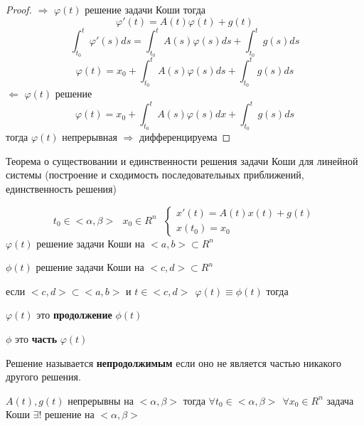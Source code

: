 \begin{proof}
  $\Rightarrow$ $\varphi(t)$ решение задачи Коши тогда
  $$
  \varphi'(t) = A(t)\varphi(t) + g(t)
  $$
  $$
  \int_{t_0}^t \varphi'(s)ds = \int_{t_0}^t A(s) \varphi(s)ds +
  \int_{t_0}^t g(s) ds
  $$
  $$
  \varphi(t) = x_0 + \int_{t_0}^t A(s) \varphi(s) ds  + \int_{t_0}^t g(s)ds
  $$
  $\Leftarrow$ $\varphi(t)$ решение
  $$
  \varphi(t) = x_0 + \int_{t_0}^t A(s)\varphi(s)dx +
  \int_{t_0}^t g(s)ds
  $$
  тогда $\varphi(t)$ непрерывная $\Rightarrow$ дифференцируема
\end{proof}

\begin{title}[\Large]
  Теорема о существовании и единственности решения задачи Коши для линейной
  системы (построение и сходимость последовательных приближений,
  единственность решения)
\end{title}

\begin{block}
  $$
  t_0 \in <\alpha, \beta> ~~~ x_0 \in R^n ~~~
  \left\{
  \begin{array}{l}
    x'(t) = A(t)x(t) + g(t) \\
    x(t_0) = x_0
  \end{array}
  \right.
  $$
  $\varphi(t)$ решение задачи Коши на $<a,b> \subset R^n$

  $\phi(t)$ решение задачи Коши на $<c,d> \subset R^n$

  если $<c,d> \subset<a,b>$ и $t \in <c,d> ~~ \varphi(t) \equiv \phi(t)$ тогда

  $\varphi(t)$ это {\bfseries продолжение} $\phi(t)$

  $\phi$ это {\bfseries часть} $\varphi(t)$

  Решение называется {\bfseries непродолжимым} если оно не является частью никакого
  другого решения.
\end{block}

\begin{theorem}
  $A(t), g(t)$ непрерывны на $<\alpha, \beta>$ тогда
  $\forall t_0 \in <\alpha, \beta> ~~ \forall x_0 \in R^n$ задача Коши
  $\exists !$ решение на $<\alpha, \beta>$
\end{theorem}


